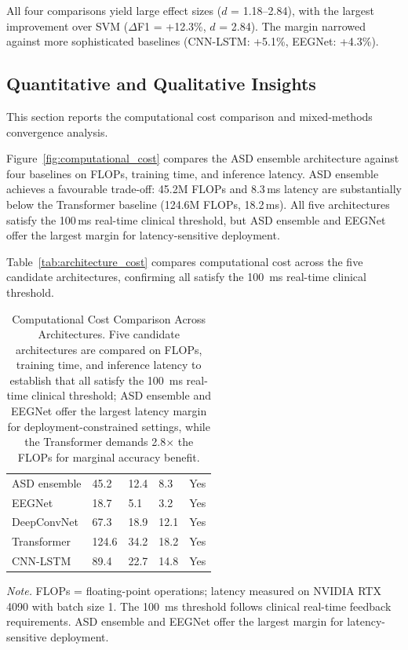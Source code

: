All four comparisons yield large effect sizes ($d$ = 1.18--2.84), with the largest improvement over SVM ($\Delta$F1 = +12.3\%, $d$ = 2.84). The margin narrowed against more sophisticated baselines (CNN-LSTM: +5.1\%, EEGNet: +4.3\%).
\fi


\subsection{Quantitative and Qualitative Insights}

This section reports the computational cost comparison and mixed-methods convergence analysis.


Figure~\ref{fig:computational_cost} compares the ASD ensemble architecture against four baselines on FLOPs, training time, and inference latency. ASD ensemble achieves a favourable trade-off: 45.2M FLOPs and 8.3\,ms latency are substantially below the Transformer baseline (124.6M FLOPs, 18.2\,ms). All five architectures satisfy the 100\,ms real-time clinical threshold, but ASD ensemble and EEGNet offer the largest margin for latency-sensitive deployment.

Table~\ref{tab:architecture_cost} compares computational cost across the five candidate architectures, confirming all satisfy the 100~ms real-time clinical threshold.

\begin{table}[!htbp]
\tablestripes\tablefontsize
\caption[Computational Cost Comparison Across Architectures]{Computational Cost Comparison Across Architectures. Five candidate architectures are compared on FLOPs, training time, and inference latency to establish that all satisfy the 100~ms real-time clinical threshold; ASD ensemble and EEGNet offer the largest latency margin for deployment-constrained settings, while the Transformer demands 2.8$\times$ the FLOPs for marginal accuracy benefit.}
\tablefontsize
\begin{tabularx}{\textwidth}{@{} >{\raggedright\arraybackslash}p{3.2cm} L L L L @{}}
\toprule
{} &  &  &  &  \\
\midrule
ASD ensemble & 45.2 & 12.4 & 8.3 & Yes \\
EEGNet & 18.7 & 5.1 & 3.2 & Yes \\
DeepConvNet & 67.3 & 18.9 & 12.1 & Yes \\
Transformer & 124.6 & 34.2 & 18.2 & Yes \\
CNN-LSTM & 89.4 & 22.7 & 14.8 & Yes \\
\bottomrule
\end{tabularx}
\vspace{0.5em}\noindent\textit{Note.} FLOPs = floating-point operations; latency measured on NVIDIA RTX 4090 with batch size 1. The 100~ms threshold follows clinical real-time feedback requirements. ASD ensemble and EEGNet offer the largest margin for latency-sensitive deployment.
\end{table}

